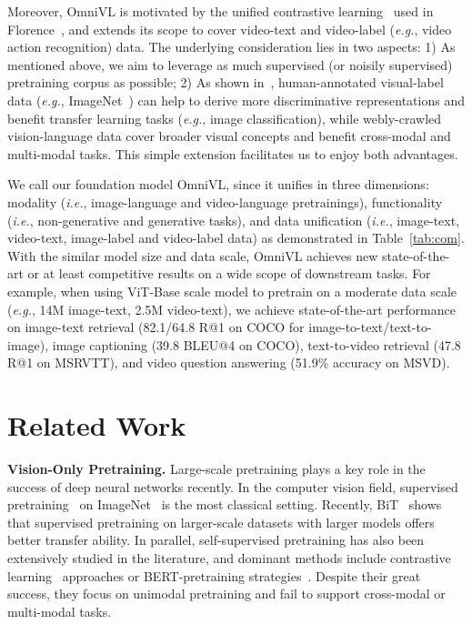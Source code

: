 \documentclass{article}
\makeatletter
\newcommand*{\system}{OmniVL\@\xspace}
\newcommand*{\eg}{\emph{e.g.}\@\xspace}
\newcommand*{\ie}{\emph{i.e.}\@\xspace}
\makeatother
\begin{document}
Moreover, \system is motivated by the unified contrastive learning~\cite{yang2022unified} used in Florence~\cite{yuan2021florence}, and extends its scope to cover video-text and video-label (\eg, video action recognition) data. The underlying consideration lies in two aspects: 1) As mentioned above, we aim to leverage as much supervised (or noisily supervised) pretraining corpus as possible; 2) As shown in~\cite{yang2022unified},  human-annotated visual-label data (\eg, ImageNet~\cite{deng2009imagenet}) can help to derive more discriminative representations and benefit transfer learning tasks (\eg, image classification), while webly-crawled vision-language data cover broader visual concepts and benefit cross-modal and multi-modal tasks. This simple extension facilitates us to enjoy both advantages.

We call our foundation model OmniVL, since it unifies in three dimensions: modality (\ie, image-language and video-language pretrainings), functionality (\ie, non-generative and generative tasks), and data unification (\ie, image-text, video-text, image-label and video-label data) as demonstrated in Table~\ref{tab:com}. With the similar model size and data scale, \system achieves new state-of-the-art or at least competitive results on a wide scope of downstream tasks. For example, when using ViT-Base scale model to pretrain on a moderate data scale (\eg,  14M image-text, 2.5M video-text), we achieve state-of-the-art performance on image-text retrieval (82.1/64.8 R@1
on COCO for image-to-text/text-to-image), image captioning (39.8 BLEU@4 on COCO), text-to-video retrieval (47.8 R@1 on MSRVTT), and video question answering (51.9\% accuracy on MSVD).

\section{Related Work}
\noindent \textbf{Vision-Only Pretraining.} Large-scale pretraining plays a key role in the success of deep neural networks recently. In the computer vision field, supervised pretraining~\cite{he2016deep,he2019rethinking,kolesnikov2020big,dong2022cswin} on ImageNet~\cite{deng2009imagenet} is the most classical setting. Recently, BiT~\cite{kolesnikov2020big} shows that supervised pretraining on larger-scale datasets with larger models offers better transfer ability. In parallel, self-supervised pretraining has also been extensively studied in the literature, and dominant methods include contrastive learning~\cite{chen2020simple,li2021improve,he2020momentum} approaches or BERT-pretraining strategies~\cite{dong2021peco,bao2021beit,wang2022bevt,dong2022bootstrapped}. Despite their great success, they focus on unimodal pretraining and fail to support cross-modal or multi-modal tasks.
\end{document}
